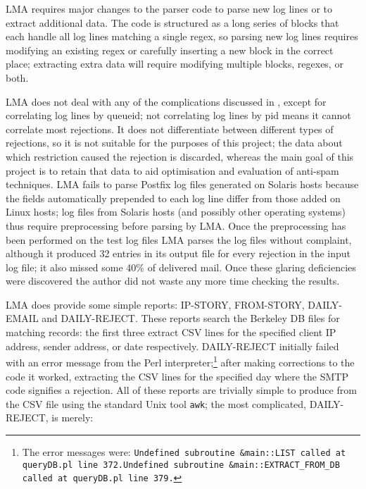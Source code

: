 \gls{LMA} requires major changes to the parser code to parse new log lines
or to extract additional data.  The code is structured as a long series of
blocks that each handle all log lines matching a single regex, so parsing
new log lines requires modifying an existing regex or carefully inserting a
new block in the correct place; extracting extra data will require
modifying multiple blocks, regexes, or both.

\gls{LMA} does not deal with any of the complications discussed in
, except for correlating log lines by queueid;
not correlating log lines by pid means it cannot correlate most rejections.
It does not differentiate between different types of rejections, so it is
not suitable for the purposes of this project; the data about which
restriction caused the rejection is discarded, whereas the main goal of
this project is to retain that data to aid optimisation and evaluation of
anti-spam techniques.  \gls{LMA} fails to parse Postfix log files generated
on Solaris hosts because the fields automatically prepended to each log
line differ from those added on Linux hosts; log files from Solaris hosts
(and possibly other operating systems) thus require preprocessing before
parsing by \gls{LMA}.  Once the preprocessing has been performed on the
\numberOFlogFILES{} test log files \gls{LMA} parses the log files without
complaint, although it produced 32 entries in its output file for every
rejection in the input log file; it also missed some 40\% of delivered
mail.  Once these glaring deficiencies were discovered the author did not
waste any more time checking the results.

\gls{LMA} does provide some simple reports: IP-STORY, FROM-STORY,
DAILY-EMAIL and DAILY-REJECT\@.  These reports search the Berkeley DB files
for matching records: the first three extract \gls{CSV} lines for the
specified client \gls{IP} address, sender address, or date respectively.
DAILY-REJECT initially failed with an error message from the Perl
interpreter;\footnote{The error messages were: \newline{}\texttt{Undefined
subroutine \&main::LIST called at queryDB.pl line
372.}\newline{}\texttt{Undefined subroutine \&main::EXTRACT\_FROM\_DB
called at queryDB.pl line 379.}} after making corrections to the code it
worked, extracting the \gls{CSV} lines for the specified day where the
\gls{SMTP} code signifies a rejection.  All of these reports are trivially
simple to produce from the \gls{CSV} file using the standard Unix tool
\texttt{awk}; the most complicated, DAILY-REJECT, is merely:

